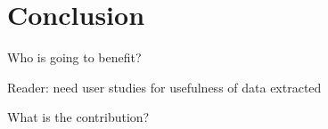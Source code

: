 \chapter{Conclusion}
\label{chap:conclusion}

Who is going to benefit?

Reader: need user studies for usefulness of data extracted

What is the contribution?